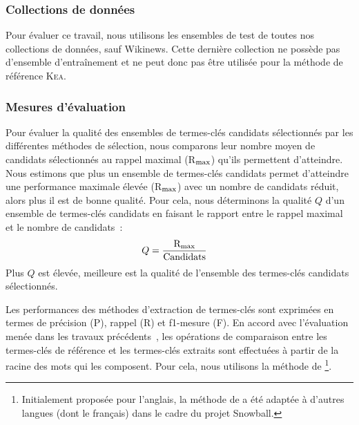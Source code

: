       \subsubsection{Collections de données}
      \label{subsubsec:main:domain_independent_keyphrase_extraction-keyphrase_candidate_selection-evaluation-evaluation_data}
        Pour évaluer ce travail, nous utilisons les ensembles de test de toutes
        nos collections de données, sauf Wikinews. Cette dernière collection ne
        possède pas d'ensemble d'entraînement et ne peut donc pas être utilisée
        pour la méthode de référence \textsc{Kea}.
      
      \subsubsection{Mesures d'évaluation}
      \label{subsubsec:main:domain_independent_keyphrase_extraction-keyphrase_candidate_selection-evaluation-evaluation_measures}
        Pour évaluer la qualité des ensembles de termes-clés candidats
        sélectionnés par les différentes méthodes de sélection, nous comparons
        leur nombre moyen de candidats sélectionnés au rappel maximal
        (R$_\textnormal{max}$) qu'ils permettent d'atteindre. Nous estimons que
        plus un ensemble de termes-clés candidats permet d'atteindre une
        performance maximale élevée (R$_\textnormal{max}$) avec un nombre de
        candidats réduit, alors plus il est de bonne qualité. Pour cela, nous
        déterminons la qualité $Q$ d'un ensemble de termes-clés candidats en
        faisant le rapport entre le rappel maximal et le nombre de candidats~:
        \begin{align}
          Q &= \frac{\textnormal{R}_{\textnormal{max}}}{\textnormal{Candidats}}
        \end{align}
        Plus $Q$ est élevée, meilleure est la qualité de l'ensemble des
        termes-clés candidats sélectionnés.

        Les performances des méthodes d'extraction de termes-clés sont exprimées
        en termes de précision (P), rappel (R) et f1-mesure (F). En
        accord avec l'évaluation menée dans les travaux
        précédents~\cite{kim2010semeval}, les opérations de comparaison entre
        les termes-clés de référence et les termes-clés extraits sont effectuées
        à partir de la racine des mots qui les composent. Pour cela, nous
        utilisons la méthode de
        \footnote{Initialement proposée pour
        l'anglais, la méthode de  a été
        adaptée à d'autres langues (dont le français) dans le cadre du projet
        Snowball.}.

